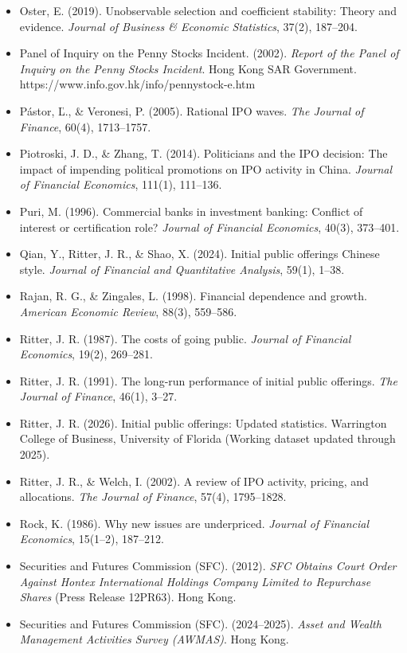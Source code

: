 \documentclass[11pt,letterpaper]{article}
\begin{document}
\begin{itemize}
\item Oster, E. (2019). Unobservable selection and coefficient stability: Theory and evidence. \textit{Journal of Business \& Economic Statistics}, 37(2), 187–204.
\item Panel of Inquiry on the Penny Stocks Incident. (2002). \textit{Report of the Panel of Inquiry on the Penny Stocks Incident}. Hong Kong SAR Government. https://www.info.gov.hk/info/pennystock-e.htm
\item Pástor, \v{L}., \& Veronesi, P. (2005). Rational IPO waves. \textit{The Journal of Finance}, 60(4), 1713–1757.
\item Piotroski, J. D., \& Zhang, T. (2014). Politicians and the IPO decision: The impact of impending political promotions on IPO activity in China. \textit{Journal of Financial Economics}, 111(1), 111–136.
\item Puri, M. (1996). Commercial banks in investment banking: Conflict of interest or certification role? \textit{Journal of Financial Economics}, 40(3), 373–401.
\item Qian, Y., Ritter, J. R., \& Shao, X. (2024). Initial public offerings Chinese style. \textit{Journal of Financial and Quantitative Analysis}, 59(1), 1–38.
\item Rajan, R. G., \& Zingales, L. (1998). Financial dependence and growth. \textit{American Economic Review}, 88(3), 559–586.
\item Ritter, J. R. (1987). The costs of going public. \textit{Journal of Financial Economics}, 19(2), 269–281.
\item Ritter, J. R. (1991). The long-run performance of initial public offerings. \textit{The Journal of Finance}, 46(1), 3–27.
\item Ritter, J. R. (2026). Initial public offerings: Updated statistics. Warrington College of Business, University of Florida (Working dataset updated through 2025).
\item Ritter, J. R., \& Welch, I. (2002). A review of IPO activity, pricing, and allocations. \textit{The Journal of Finance}, 57(4), 1795–1828.
\item Rock, K. (1986). Why new issues are underpriced. \textit{Journal of Financial Economics}, 15(1–2), 187–212.
\item Securities and Futures Commission (SFC). (2012). \textit{SFC Obtains Court Order Against Hontex International Holdings Company Limited to Repurchase Shares} (Press Release 12PR63). Hong Kong.
\item Securities and Futures Commission (SFC). (2024–2025). \textit{Asset and Wealth Management Activities Survey (AWMAS)}. Hong Kong.

\end{itemize}
\end{document}
